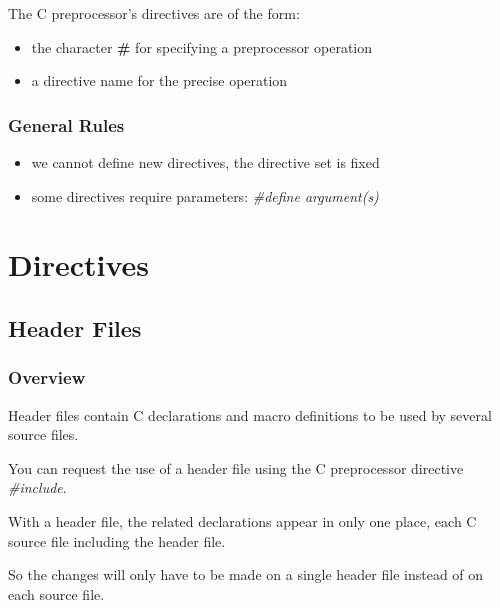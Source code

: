 {\begin{frame}
  The C preprocessor's directives are of the form:

  \begin{itemize}[<+->]
    \item
      the character \textbf{\#} for specifying a preprocessor operation
    \item
      a directive name for the precise operation
  \end{itemize}
\end{frame}


\begin{frame}
  \frametitle{General Rules}

  \begin{itemize}[<+->]
    \item
      we \alert{cannot} define new directives, the directive set is fixed
    \item
      some directives require parameters: \textit{\#define argument(s)}
  \end{itemize}
\end{frame}

%
%

\section{Directives}

%
%

\subsection{Header Files}


\begin{frame}
  \frametitle{Overview}

  Header files contain C declarations and macro definitions to be used
  by several source files.

  \nl

  You can request the use of a header file using the C preprocessor
  directive \textit{\#include}.

  \nl

  With a header file, the related declarations appear in only one place,
  each C source file including the header file.

  \nl

  So the changes will only have to be made on a single header file
  instead of on each source file.
\end{frame}

}
